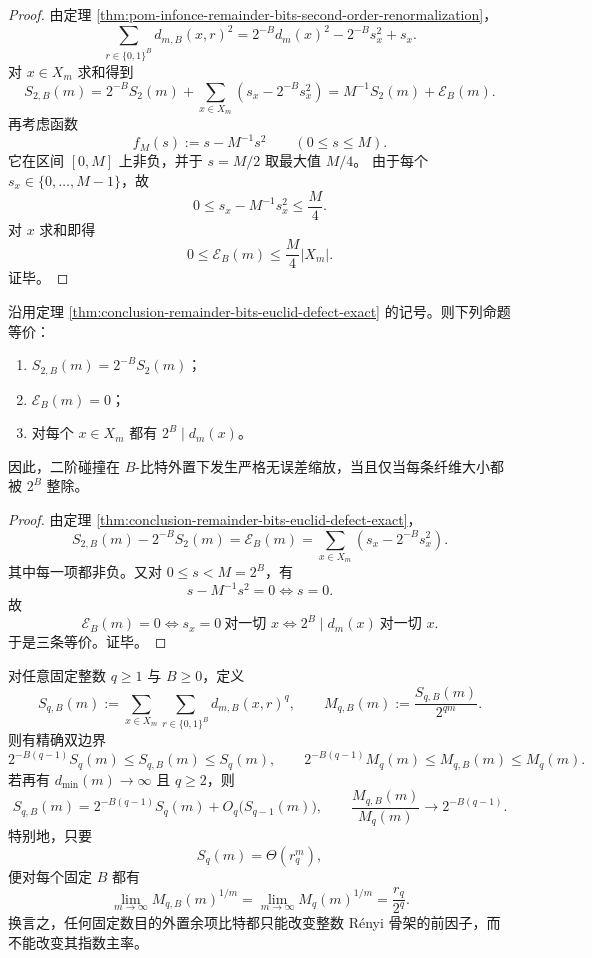 \begin{proof}
由定理 \ref{thm:pom-infonce-remainder-bits-second-order-renormalization}，
\[
\sum_{r\in\{0,1\}^B}d_{m,B}(x,r)^2
=
2^{-B}d_m(x)^2-2^{-B}s_x^2+s_x.
\]
对 \(x\in X_m\) 求和得到
\[
S_{2,B}(m)
=
2^{-B}S_2(m)+\sum_{x\in X_m}\left(s_x-2^{-B}s_x^2\right)
=
M^{-1}S_2(m)+\mathcal E_B(m).
\]
再考虑函数
\[
f_M(s):=s-M^{-1}s^2
\qquad (0\le s\le M).
\]
它在区间 \([0,M]\) 上非负，并于 \(s=M/2\) 取最大值 \(M/4\)。
由于每个 \(s_x\in\{0,\dots,M-1\}\)，故
\[
0\le s_x-M^{-1}s_x^2\le \frac{M}{4}.
\]
对 \(x\) 求和即得
\[
0\le \mathcal E_B(m)\le \frac{M}{4}|X_m|.
\]
证毕。
\end{proof}

\begin{corollary}\label{cor:conclusion-perfect-dyadic-renormalization-divisibility}
沿用定理 \ref{thm:conclusion-remainder-bits-euclid-defect-exact} 的记号。则下列命题等价：
\begin{enumerate}
  \item \(S_{2,B}(m)=2^{-B}S_2(m)\)；
  \item \(\mathcal E_B(m)=0\)；
  \item 对每个 \(x\in X_m\) 都有 \(2^B\mid d_m(x)\)。
\end{enumerate}
因此，二阶碰撞在 \(B\)-比特外置下发生严格无误差缩放，当且仅当每条纤维大小都被 \(2^B\) 整除。
\end{corollary}

\begin{proof}
由定理 \ref{thm:conclusion-remainder-bits-euclid-defect-exact}，
\[
S_{2,B}(m)-2^{-B}S_2(m)=\mathcal E_B(m)=\sum_{x\in X_m}\left(s_x-2^{-B}s_x^2\right).
\]
其中每一项都非负。又对 \(0\le s<M=2^B\)，有
\[
s-M^{-1}s^2=0 \iff s=0.
\]
故
\[
\mathcal E_B(m)=0
\iff
s_x=0\ \text{对一切 }x
\iff
2^B\mid d_m(x)\ \text{对一切 }x.
\]
于是三条等价。证毕。
\end{proof}

\begin{theorem}\label{thm:conclusion-fixed-remainder-bits-renyi-exponential-silence}
对任意固定整数 \(q\ge 1\) 与 \(B\ge 0\)，定义
\[
S_{q,B}(m):=\sum_{x\in X_m}\sum_{r\in\{0,1\}^B}d_{m,B}(x,r)^q,
\qquad
M_{q,B}(m):=\frac{S_{q,B}(m)}{2^{qm}}.
\]
则有精确双边界
\[
2^{-B(q-1)}S_q(m)\le S_{q,B}(m)\le S_q(m),
\qquad
2^{-B(q-1)}M_q(m)\le M_{q,B}(m)\le M_q(m).
\]
若再有 \(d_{\min}(m)\to\infty\) 且 \(q\ge 2\)，则
\[
S_{q,B}(m)=2^{-B(q-1)}S_q(m)+O_q\!\bigl(S_{q-1}(m)\bigr),
\qquad
\frac{M_{q,B}(m)}{M_q(m)}\to 2^{-B(q-1)}.
\]
特别地，只要
\[
S_q(m)=\Theta(r_q^m),
\]
便对每个固定 \(B\) 都有
\[
\lim_{m\to\infty}M_{q,B}(m)^{1/m}
=
\lim_{m\to\infty}M_q(m)^{1/m}
=
\frac{r_q}{2^q}.
\]
换言之，任何固定数目的外置余项比特都只能改变整数 Rényi 骨架的前因子，而不能改变其指数主率。
\end{theorem}

